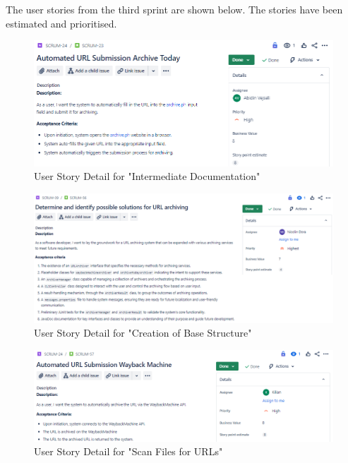 The user stories from the third sprint are shown below. The stories have been estimated and prioritised.
\begin{figure}[h!]
    \centering
    \includegraphics[width=1\textwidth]{pictures/Scrum/Sprint 3/UserStory_8}
    \caption{User Story Detail for "Intermediate Documentation"}
    \label{fig:sprint_3_userstory_1}
\end{figure}
\begin{figure}[h!]
    \centering
    \includegraphics[width=1\textwidth]{pictures/Scrum/Sprint 3/UserStory_14}
    \caption{User Story Detail for "Creation of Base Structure"}
    \label{fig:sprint_3_userstory_2}
\end{figure}
\begin{figure}[h!]
    \centering
    \includegraphics[width=1\textwidth]{pictures/Scrum/Sprint 3/UserStory_15}
    \caption{User Story Detail for "Scan Files for URLs"}
    \label{fig:sprint_3_userstory_3}
\end{figure}

